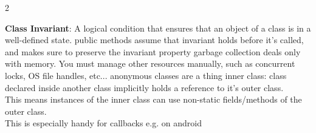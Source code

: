 \documentclass{article}
\def \columncount {2}
\renewcommand\labelitemi{\hspace{-1in}\tiny$\bullet$}
\renewcommand\labelitemii{\labelitemi}
\begin{document}
\begin{multicols}{\columncount}
\begin{outline}[longenum]


  \1 \textbf{Class Invariant}: A logical condition that ensures that an object of a class is in a well-defined state.
    \2 public methods assume that invariant holds before it's called, and makes sure to preserve the invariant property
  \1 garbage collection deals only with memory. You must manage other resources manually, such as concurrent locks, OS file handles, etc...
  \1 anonymous classes are a thing
  \1 inner class:
    class declared inside another class implicitly holds a reference to it's outer class. 
    \\ This means instances of the inner class can use non-static fields/methods of the outer class.
    \\ This is especially handy for callbacks e.g. on android


\end{outline}
\end{multicols}
\end{document}

